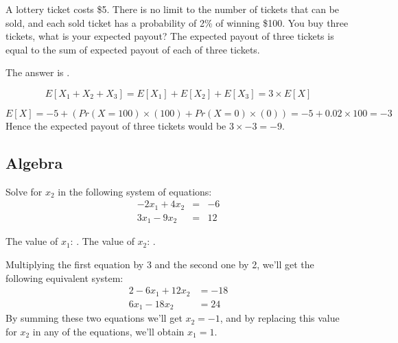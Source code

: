 \documentclass{ximera}
\begin{document}
\begin{question}
A lottery ticket costs \$5. 
There is no limit to the number of tickets that can be sold, and each sold ticket has a probability of 2\% of winning \$100.
You buy three tickets, what is your expected payout?
The expected payout of three tickets is equal to the sum of expected payout of each of three tickets. 
\begin{solution}
The answer is .
\end{solution}
\begin{equation*}
E[X_1 + X_2 + X_3] = E[X_1] + E[X_2] + E[X_3] = 3 \times E[X]
\end{equation*}

\begin{equation*}
E[X] = -5 + \left(Pr(X = 100) \times (100) + Pr(X = 0) \times (0)\right) = -5 + 0.02 \times 100 = -3
\end{equation*}
Hence the expected payout of three tickets would be $3 \times -3 = -9$.
\end{question}


\subsection*{Algebra}

\begin{question}
Solve for $x_2$ in the following system of equations:
\begin{eqnarray*}
-2x_1 + 4x_2 & = &-6\\
3x_1  - 9x_2 & = & 12 
\end{eqnarray*}
\vspace*{13pt}
\begin{solution}
The value of $x_1$: .
The value of $x_2$: .
\end{solution}
Multiplying the first equation by 3 and the second one by 2, we'll get the following equivalent system:
\begin{alignat*}{2}
 -6  x_1  + 12  x_2 & = -18 \\
 6  x_1  - 18  x_2 & = 24
\end{alignat*}
By summing these two equations we'll get $x_2 = -1$, and by replacing this value for $x_2$ in any of the equations, we'll obtain $x_1 = 1$.
\end{question}
\end{document}
